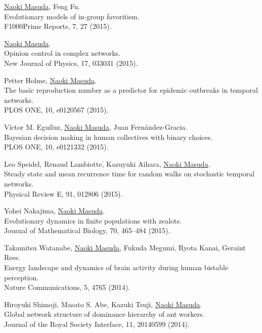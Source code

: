 \documentclass[11pt,letter]{article}
\begin{document}
\begin{etaremune}
\item \underline{Naoki Masuda}, Feng Fu.\\
Evolutionary models of in-group favoritism.\\
F1000Prime Reports, 7, 27 (2015).

\item \underline{Naoki Masuda}.\\
Opinion control in complex networks.\\
New Journal of Physics, 17, 033031 (2015).

\item Petter Holme, \underline{Naoki Masuda}.\\
The basic reproduction number as a predictor for epidemic outbreaks in temporal networks.\\
PLOS ONE, 10, e0120567 (2015).

\item V\'{i}ctor M. Egu\'{i}luz, \underline{Naoki Masuda}, Juan Fern\'{a}ndez-Gracia.\\
Bayesian decision making in human collectives with binary choices.\\
PLOS ONE, 10, e0121332 (2015).

\item Leo Speidel, Renaud Lambiotte, Kazuyuki Aihara, \underline{Naoki Masuda}.\\
Steady state and mean recurrence time for random walks on stochastic temporal networks.\\
Physical Review E, 91, 012806 (2015).

\item Yohei Nakajima, \underline{Naoki Masuda}.\\
Evolutionary dynamics in finite populations with zealots.\\
Journal of Mathematical Biology, 70, 465--484 (2015).

\item Takamitsu Watanabe, \underline{Naoki Masuda}, Fukuda Megumi, Ryota Kanai, Geraint Rees.\\
Energy landscape and dynamics of brain activity during human bistable perception.\\
Nature Communications, 5, 4765 (2014).

\item Hiroyuki Shimoji, Masato S. Abe, Kazuki Tsuji, \underline{Naoki Masuda}.\\
Global network structure of dominance hierarchy of ant workers.\\
Journal of the Royal Society Interface, 11, 20140599 (2014).


\end{etaremune}
\end{document}
